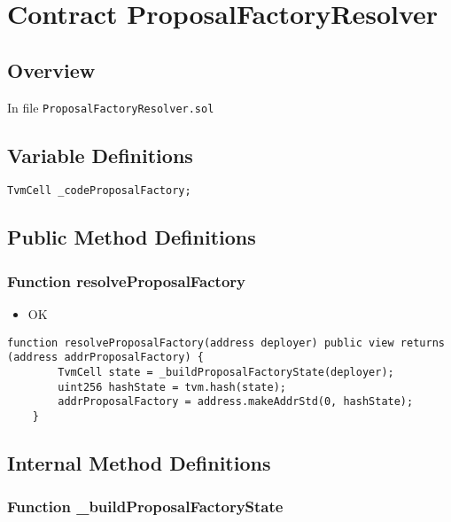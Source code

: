 
\chapter{Contract ProposalFactoryResolver}

\minitoc

\section{Overview}


In file {\tt ProposalFactoryResolver.sol}

\section{Variable Definitions}

\begin{lstlisting}[firstnumber=6]
    TvmCell _codeProposalFactory;
\end{lstlisting}

\section{Public Method Definitions}


\subsection{Function resolveProposalFactory}

\begin{itemize}
\item OK
\end{itemize}

\begin{lstlisting}[firstnumber=8]
    function resolveProposalFactory(address deployer) public view returns (address addrProposalFactory) {
        TvmCell state = _buildProposalFactoryState(deployer);
        uint256 hashState = tvm.hash(state);
        addrProposalFactory = address.makeAddrStd(0, hashState);
    }
\end{lstlisting}

\section{Internal Method Definitions}


\subsection{Function \_{}buildProposalFactoryState}

